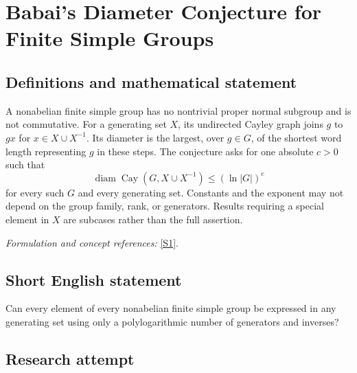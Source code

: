 \documentclass[11pt,a4paper]{article}
\newcommand{\sref}[2]{\hyperlink{source:#1:#2}{[S#2]}}
\newif\ifshowcatalogue
\newcommand{\cataloguescope}[1]{\ifshowcatalogue
 \paragraph{Exact scope in the supplied catalogue.}
 \begin{quote}\small #1\end{quote}\fi}
\numberwithin{equation}{section}
\begin{document}
\setcounter{section}{0}
\clearpage
\section*{\texorpdfstring{Babai's Diameter Conjecture for Finite Simple Groups}{Babai's Diameter Conjecture for Finite Simple Groups}}\label{statement}
\subsection{Definitions and mathematical statement}
A nonabelian finite simple group has no nontrivial proper normal subgroup and is not commutative. For a generating set $X$, its undirected Cayley graph joins $g$ to $gx$ for $x\in X\cup X^{-1}$. Its diameter is the largest, over $g\in G$, of the shortest word length representing $g$ in these steps. The conjecture asks for one absolute $c>0$ such that
\[
 \operatorname{diam}\operatorname{Cay}(G,X\cup X^{-1})\le(\ln|G|)^c
\]
for every such $G$ and every generating set. Constants and the exponent may not depend on the group family, rank, or generators. Results requiring a special element in $X$ are subcases rather than the full assertion.
\par\smallskip\textit{Formulation and concept references:} \sref{statement}{1}.
\cataloguescope{Is there an absolute constant c>0 such that for every nonabelian finite simple group G and every generating set X of G, the undirected Cayley graph with steps X union X\textasciicircum{}\{-1\} has diameter at most (ln |G|)\textasciicircum{}c? Thus every element of G is a word of that length in X and its inverses, with the same c for all groups and generating sets.}
\subsection{Short English statement}
Can every element of every nonabelian finite simple group be expressed in any generating set using only a polylogarithmic number of generators and inverses?
\subsection{Research attempt}
\end{document}
